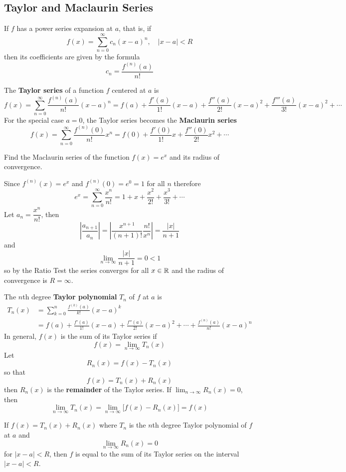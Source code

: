 \subsection{Taylor and Maclaurin Series}

\begin{theorem}
    If \(f\) has a power series expansion at \(a\), that is, if
    \[f(x)=\sum_{n=0}^\infty c_n(x-a)^n,\quad|x-a|<R\]
    then its coefficients are given by the formula
    \[c_n=\frac{f^{(n)}(a)}{n!}\]
\end{theorem}
The \textbf{Taylor series} of a function \(f\) centered at \(a\) is
\[f(x)=\sum_{n=0}^{\infty}\frac{f^{(n)}(a)}{n!}(x-a)^n
=f(a)+\frac{f'(a)}{1!}(x-a)+\frac{f''(a)}{2!}(x-a)^2+\frac{f'''(a)}{3!}(x-a)^2
+\cdots\]
For the special case \(a=0\), the Taylor series becomes the
\textbf{Maclaurin series}
\[f(x)=\sum_{n=0}^{\infty}\frac{f^{(n)}(0)}{n!}x^n
=f(0)+\frac{f'(0)}{1!}x+\frac{f''(0)}{2!}x^2+\cdots\]
\begin{problem}
    Find the Maclaurin series of the function \(f(x)=e^x\) and its radius of
    convergence.
\end{problem}
\begin{solution}
    Since \(f^{(n)}(x)=e^x\) and \(f^{(n)}(0)=e^0=1\) for all \(n\)
    therefore
    \[e^x=\sum_{n=0}^\infty\frac{x^n}{n!}
    =1+x+\frac{x^2}{2!}+\frac{x^3}{3!}+\cdots\]
    Let \(a_n=\dfrac{x^n}{n!}\), then
    \[\left|\frac{a_{n+1}}{a_n}\right|
    =\left|\frac{x^{n+1}}{(n+1)!}\frac{n!}{x^n}\right|=\frac{|x|}{n+1}\]
    and
    \[\lim_{n\to\infty}\frac{|x|}{n+1}=0<1\]
    so by the Ratio Test the series converges for all \(x\in\mathbb{R}\) and the
    radius of convergence is \(R=\infty\).
\end{solution}
The \(n\)th degree \textbf{Taylor polynomial} \(T_n\) of \(f\) at \(a\) is
\begin{align*}
    T_n(x) &= \sum_{k=0}^{n}\frac{f^{(k)}(a)}{k!}(x-a)^k \\
    &= f(a)+\frac{f'(a)}{1!}(x-a)+\frac{f''(a)}{2!}(x-a)^2+\cdots
    +\frac{f^{(n)}(a)}{n!}(x-a)^n
\end{align*}
In general, \(f(x)\) is the sum of its Taylor series if
\[f(x)=\lim_{n\to\infty}T_n(x)\]
Let
\[R_n(x)=f(x)-T_n(x)\]
so that
\[f(x)=T_n(x)+R_n(x)\]
then \(R_n(x)\) is the \textbf{remainder} of the Taylor series.
If \(\displaystyle{\lim_{n\to\infty}R_n(x)=0}\), then
\[\lim_{n\to\infty}T_n(x)=\lim_{n\to\infty}\Big[f(x)-R_n(x)\Big]=f(x)\]
\begin{theorem}
    If \(f(x)=T_n(x)+R_n(x)\) where \(T_n\) is the \(n\)th degree Taylor
    polynomial of \(f\) at \(a\) and
    \[\lim_{n\to\infty}R_n(x)=0\]
    for \(|x-a|<R\), then \(f\) is equal to the sum of its Taylor series on
    the interval \(|x-a|<R\).
\end{theorem}
